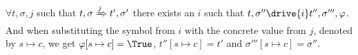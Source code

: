 \begin{lemma}
  \label{lem:completeDrive}
  $\forall t,\sigma,j$ such that $t,\sigma \xRightarrow[]{j} t',\sigma'$
  there exists an $i$ such that $t,\sigma''\drive{i} t'',\sigma''',\phi$.
  And when substituting the symbol from $i$ with the concrete value from $j$, denoted by $s\mapsto c$,
  we get $\phi[s\mapsto c]=\True$, $t''[s\mapsto c] = t'$ and $\sigma'''[s\mapsto c]=\sigma''$.
\end{lemma}
